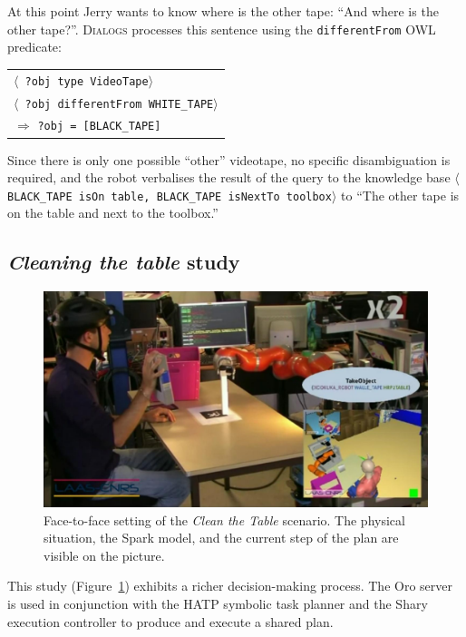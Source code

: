 \documentclass[preprint,3p,times]{elsarticle}
\newcommand{\concept}[1]{{\small \texttt{#1}}}
\newcommand{\stmt}[1]{{\footnotesize \tt $\langle$ #1\relax$\rangle$}}
\begin{document}
At this point Jerry wants to know where is the other tape: ``And where is the
other tape?''. \textsc{Dialogs} processes this sentence using the
\concept{differentFrom} OWL predicate:

\begin{center}
\begin{tabular}{l}
\stmt{?obj type VideoTape}\\
\stmt{?obj differentFrom WHITE\_TAPE}\\
\hspace{0.7cm}$\Rightarrow$ \concept{?obj = [BLACK\_TAPE]}
\end{tabular}
\end{center}

Since there is only one possible ``other'' videotape, no specific disambiguation is
required, and the robot verbalises the result of the query to the knowledge
base \stmt{BLACK\_TAPE isOn table, BLACK\_TAPE isNextTo toolbox} to ``The other
tape is on the table and next to the toolbox.''

\subsection{\emph{Cleaning the table} study}

\begin{figure}[ht!]
    \centering
    \includegraphics[width=0.6\columnwidth]{cleantable.jpg}

    \caption{Face-to-face setting of the \emph{Clean the Table} scenario. The
    physical situation, the {\sc Spark} model, and the current step of the plan
    are visible on the picture.}

    \label{fig|cleantable-video}
\end{figure}


This study (Figure~\ref{fig|cleantable-video}) exhibits a richer decision-making
process. The {\sc Oro} server is used in conjunction with the HATP symbolic task
planner and the {\sc Shary} execution controller to produce and execute a shared
plan.

\end{document}

